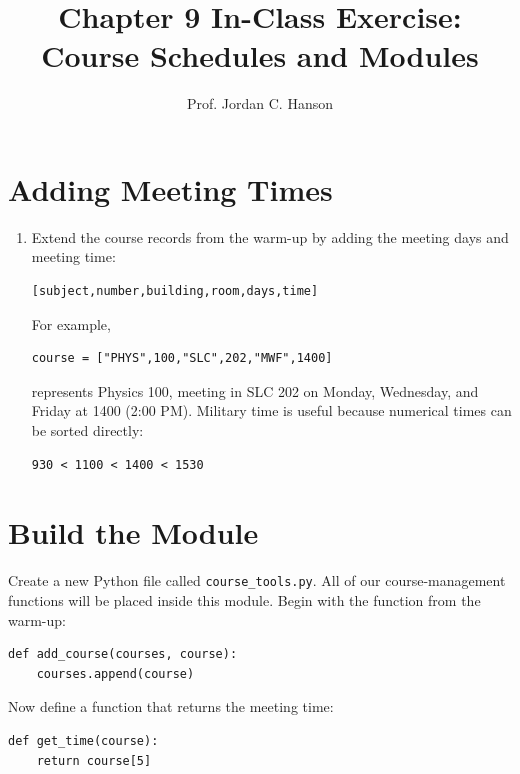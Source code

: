 \documentclass{article}
\begin{document}
\twocolumn

\title{Chapter 9 In-Class Exercise: Course Schedules and Modules}
\author{Prof. Jordan C. Hanson}
\date{}

\maketitle

\section{Adding Meeting Times}

\begin{enumerate}

\item Extend the course records from the warm-up by adding the meeting days and meeting time:

\begin{verbatim}
[subject,number,building,room,days,time]
\end{verbatim}

For example,

\begin{verbatim}
course = ["PHYS",100,"SLC",202,"MWF",1400]
\end{verbatim}

represents Physics 100, meeting in SLC 202 on Monday, Wednesday, and Friday at 1400 (2:00 PM).  Military time is useful because numerical times can be sorted directly:

\begin{verbatim}
930 < 1100 < 1400 < 1530
\end{verbatim}

\end{enumerate}


\section{Build the Module}

Create a new Python file called \verb+course_tools.py+.  All of our course-management functions will be placed inside
this module.  Begin with the function from the warm-up:

\begin{verbatim}
def add_course(courses, course):
    courses.append(course)
\end{verbatim}

Now define a function that returns the meeting time:

\begin{verbatim}
def get_time(course):
    return course[5]
\end{verbatim}
\end{document}
